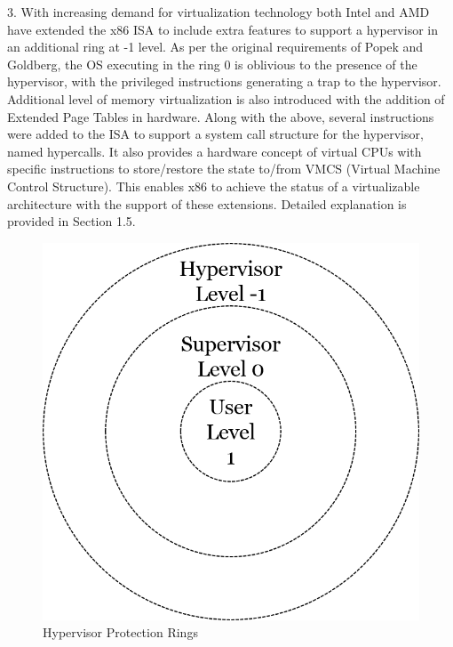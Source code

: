 3. With increasing demand for virtualization technology both Intel and AMD have extended the x86 ISA to include extra features to support a hypervisor in an additional ring at -1 level. As per the original requirements of Popek and Goldberg, the OS executing in the ring 0 is oblivious to the presence of the hypervisor, with the privileged instructions generating a trap to the hypervisor. Additional level of memory virtualization is also introduced with the addition of Extended Page Tables in hardware. Along with the above, several instructions were added to the ISA to support a system call structure for the hypervisor, named hypercalls. It also provides a hardware concept of virtual CPUs with specific instructions to store/restore the state to/from VMCS (Virtual Machine Control Structure). This enables x86 to achieve the status of a virtualizable architecture with the support of these extensions. Detailed explanation is provided in Section 1.5. 

\setlength{\belowcaptionskip}{-10pt}

\begin{figure}[H]
  \centering
  \includegraphics[scale=0.6]{figures/protect_hyper.png}
  \caption{Hypervisor Protection Rings}
  \label{fig:hyper_rings}
\end{figure}

